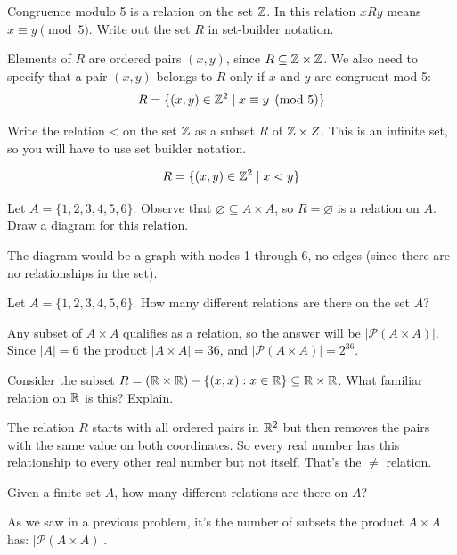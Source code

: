 \documentclass{article}
\begin{document}
\begin{problem}
Congruence modulo 5 is a relation on the set $\mathbb{Z}$. In this relation $xRy$ means $x \equiv y \pmod{5}$. Write out the set $R$ in set-builder notation.
\end{problem}

Elements of $R$ are ordered pairs $(x, y)$, since $R \subseteq \mathbb{Z} \times \mathbb{Z}$. We also need to specify that a pair $(x, y)$ belongs to $R$ only if $x$ and $y$ are congruent mod 5:
$$R = \{(x,y) \in \mathbb{Z}^2 \mid x \equiv y \pmod{5}\}$$

\begin{problem}
Write the relation < on the set $\mathbb{Z}$ as a subset $R$ of $\mathbb{Z} \times Z$. This is an infinite set, so you will have to use set builder notation.
\end{problem}

$$R = \{(x, y) \in \mathbb{Z}^2 \mid x < y\}$$

\begin{problem}
Let $A = \{1, 2, 3, 4, 5, 6\}$. Observe that $\varnothing \subseteq A \times A$, so $R = \varnothing$ is a relation on $A$. Draw a diagram for this relation.
\end{problem}

The diagram would be a graph with nodes 1 through 6, no edges (since there are no relationships in the set).

\begin{problem}
Let $A = \{1, 2, 3, 4, 5, 6\}$. How many different relations are there on the set $A$?
\end{problem}

Any subset of $A \times A$ qualifies as a relation, so the answer will be $|\mathcal{P}(A \times A)|$. Since $|A| = 6$ the product $|A \times A| = 36$, and $|\mathcal{P}(A \times A)| = 2^{36}$.

\begin{problem}
Consider the subset $R = (\mathbb{R} \times \mathbb{R}) - \{(x, x) : x \in \mathbb{R}\} \subseteq \mathbb{R} \times \mathbb{R}$. What familiar relation on $\mathbb{R}$ is this? Explain.
\end{problem}

The relation $R$ starts with all ordered pairs in $\mathbb{R}^2$ but then removes the pairs with the same value on both coordinates. So every real number has this relationship to every other real number but not itself. That's the $\neq$ relation.

\begin{problem}
Given a finite set $A$, how many different relations are there on $A$?
\end{problem}

As we saw in a previous problem, it's the number of subsets the product $A \times A$ has: $|\mathcal{P}(A \times A)|$.
\end{document}
